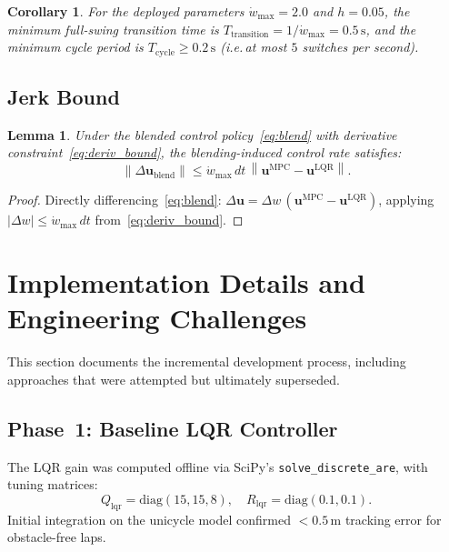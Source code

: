 \documentclass[journal]{IEEEtran}
\newtheorem{lemma}{Lemma}
\newtheorem{corollary}{Corollary}
\newcommand{\norm}[1]{\left\lVert#1\right\rVert}
\begin{document}
\begin{corollary}
  For the deployed parameters \(\dot{w}_{\max}=2.0\) and \(h=0.05\), the
  minimum full-swing transition time is
  \(T_{\mathrm{transition}} = 1/\dot{w}_{\max} = 0.5\,\text{s}\), and the
  minimum cycle period is
  \(T_{\mathrm{cycle}} \geq 0.2\,\text{s}\) (i.e.\,at most $5$ switches per second).
\end{corollary}

\subsection{Jerk Bound}

\begin{lemma}\label{lem:jerk}
  Under the blended control policy~\eqref{eq:blend} with derivative
  constraint~\eqref{eq:deriv_bound}, the blending-induced control rate
  satisfies:
  \begin{equation}
    \norm{\Delta\mathbf{u}_{\mathrm{blend}}}
    \leq \dot{w}_{\max}\,dt\,\norm{\mathbf{u}^{\mathrm{MPC}} - \mathbf{u}^{\mathrm{LQR}}}.
  \end{equation}
\end{lemma}

\begin{proof}
  Directly differencing~\eqref{eq:blend}:
  $\Delta\mathbf{u} = \Delta w\,(\mathbf{u}^{\mathrm{MPC}} - \mathbf{u}^{\mathrm{LQR}})$,
  applying \(|\Delta w| \leq \dot{w}_{\max}\,dt\) from~\eqref{eq:deriv_bound}.
\end{proof}

\section{Implementation Details and Engineering Challenges}\label{sec:implementation}

This section documents the incremental development process, including
approaches that were attempted but ultimately superseded.

\subsection{Phase~1: Baseline LQR Controller}

The LQR gain was computed offline via SciPy's \texttt{solve\_discrete\_are},
with tuning matrices:
\[
  Q_{\mathrm{lqr}} = \mathrm{diag}(15, 15, 8),\quad
  R_{\mathrm{lqr}} = \mathrm{diag}(0.1, 0.1).
\]
Initial integration on the unicycle model confirmed \(<0.5\,\text{m}\) tracking
error for obstacle-free laps.
\end{document}
